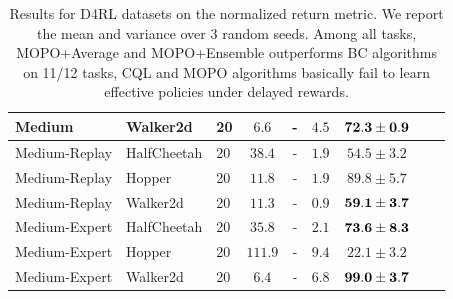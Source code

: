 \begin{table}[h]
\begin{tabular}{lll|cc|cccc}
        Medium                          & Walker2d                            & 20                             & $6.6$                      & -                            & $4.5$                           & $\bf{72.3 \pm 0.9}$                                                                                    \\
        \midrule
        Medium-Replay                   & HalfCheetah                         & 20                             & $38.4$                     & -                            & $1.9$                           & $54.5 \pm 3.2$                                                                                         \\
        Medium-Replay                   & Hopper                              & 20                             & $11.8$                     & -                            & $1.9$                           & $89.8 \pm 5.7$                                                                                         \\
        Medium-Replay                   & Walker2d                            & 20                             & $11.3$                     & -                            & $0.9$                           & $\bf{59.1 \pm 3.7}$                                                                                    \\
        \midrule
        Medium-Expert                   & HalfCheetah                         & 20                             & $35.8$                     & -                            & $2.1$                           & $\bf{73.6 \pm 8.3}$                                                                                    \\
        Medium-Expert                   & Hopper                              & 20                             & $111.9$                    & -                            & $9.4$                           & $22.1 \pm 3.2$                                                                                         \\
        Medium-Expert                   & Walker2d                            & 20                             & $6.4$                      & -                            & $6.8$                           & $\bf{99.0 \pm 3.7}$                                                                                    \\
        \bottomrule
    \end{tabular}
    \caption{
        Results for D4RL datasets on the normalized return metric. We report the mean
        and variance over 3 random seeds. Among all tasks, MOPO+Average and MOPO+Ensemble outperforms BC
        algorithms on 11/12 tasks, CQL and MOPO algorithms basically fail to learn effective policies
        under delayed rewards.}
    \label{tbl:mujoco_results}
\end{table}

